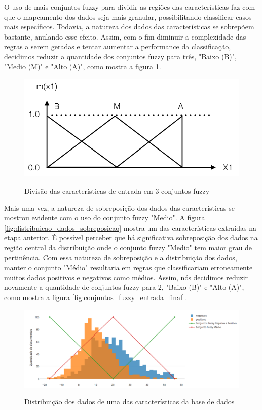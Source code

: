 O uso de mais conjuntos fuzzy para dividir as regiões das características faz com que o mapeamento dos dados seja mais granular, possibilitando classificar casos mais específicos. Todavia, a natureza dos dados das características se sobrepõem bastante, anulando esse efeito. Assim, com o fim diminuir a complexidade das regras a serem geradas e tentar aumentar a performance da classificação, decidimos reduzir a quantidade dos conjuntos fuzzy para três, "Baixo (B)", "Medio (M)" e "Alto (A)", como mostra a figura \ref{figura:tres_conjuntos_fuzzy}.

\begin{figure}[h]
\caption{Divisão das características de entrada em 3 conjuntos fuzzy}
\centering
\includegraphics[scale=0.45]{tres_conjuntos_fuzzy.png}
\label{figura:tres_conjuntos_fuzzy}
\end{figure}

Mais uma vez, a natureza de sobreposição dos dados das características se mostrou evidente com o uso do conjunto fuzzy "Medio". A figura \ref{fig:distribuicao_dados_sobreposicao} mostra um das características extraídas na etapa anterior. É possível perceber que há significativa sobreposição dos dados na região central da distribuição onde o conjunto fuzzy "Medio" tem maior grau de pertinência. Com essa natureza de sobreposição e a distribuição dos dados, manter o conjunto "Médio" resultaria em regras que classificariam erroneamente muitos dados positivos e negativos como médios. Assim, nós decidimos reduzir novamente a quantidade de conjuntos fuzzy para 2, "Baixo (B)" e "Alto (A)", como mostra a figura \ref{fig:conjuntos_fuzzy_entrada_final}. 

\begin{figure}[h]
\caption{Distribuição dos dados de uma das características da base de dados}
\centering
\includegraphics[scale=0.45]{distribuicao_dados_sobreposicao.png}
\label{figura:distribuicao_dados_sobreposicao}
\end{figure}

